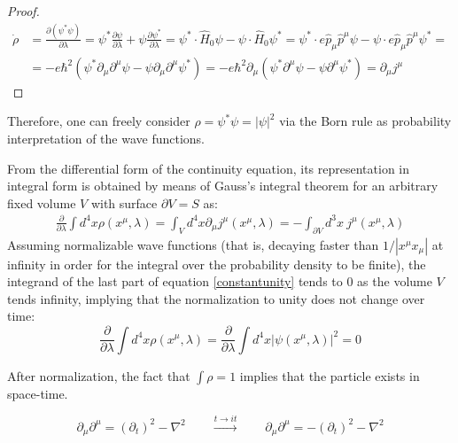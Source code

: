 \documentclass[a4paper,10pt]{article}
\numberwithin{equation}{section}
\begin{document}
\begin{proof}
\begin{align*}
    \dot{\rho} & =  \frac{\partial\left( \psi^* \psi\right) }{\partial \lambda}  = \psi^* \frac{\partial\psi}{\partial \lambda}  +  \psi \frac{\partial\psi^*}{\partial \lambda}    = \psi^* \cdot \hat{H}_0 \psi - \psi \cdot \hat{H}_0 \psi^* =  \psi^*  \cdot e \hat{p}_\mu \hat{p}^\mu \psi - \psi  \cdot e \hat{p}_\mu \hat{p}^\mu  \psi^*  =\\ 
    & = - e \hbar^2 \left( \psi^* \partial_\mu \partial^\mu \psi - \psi \partial_\mu \partial^\mu \psi^*   \right)
    =  -e \hbar^2 \partial_\mu \left( \psi^* \partial^\mu \psi - \psi \partial^\mu \psi^* \right)  = \partial_\mu j^\mu
\end{align*}
\end{proof}

Therefore, one can freely consider $\rho = \psi^* \psi = |\psi|^2$ via the Born rule as probability interpretation of the wave functions.

From the differential form of the continuity equation, its representation in integral form is obtained by means of Gauss’s integral theorem for an arbitrary fixed volume $V$ with surface $\partial V = S$ as:
\begin{eqnarray}
    \frac{\partial}{\partial \lambda} \int d^4 x \rho (x^\mu, \lambda) = \int_V d^4 x \partial_\mu j^\mu (x^\mu, \lambda)  = - \int_{\partial V}  d^3 x \ j^\mu (x^\mu, \lambda)   
    \label{constantunity}
\end{eqnarray}
Assuming normalizable wave functions (that is, decaying faster than $1/|x^\mu x_\mu|$ at infinity in order for the integral over the probability density to be finite), the integrand of the last part of equation \ref{constantunity} tends to 0 as the volume $V$ tends infinity, implying that the normalization to unity does not change over time:
\begin{equation}
    \frac{\partial}{\partial \lambda}  \int d^4 x \rho (x^\mu, \lambda)  =  \frac{\partial}{\partial \lambda} \int d^4 x |\psi (x^\mu, \lambda)|^2 = 0 
\end{equation}

After normalization, the fact that $\int \rho = 1$ implies that the particle exists in space-time.   




\iffalse

\begin{equation}
    \partial_\mu\partial^\mu = (\partial_t)^2 - \nabla^2 \qquad  \stackrel{t \to it}{\rightarrow} \qquad \partial_\mu\partial^\mu = - (\partial_t)^2 - \nabla^2
\end{equation}
\end{document}
